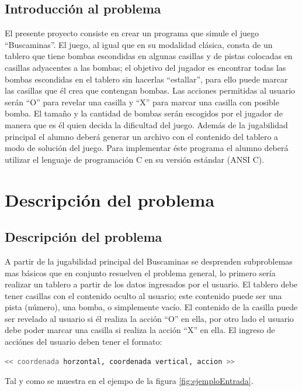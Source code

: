 \documentclass[letterpaper,12pt]{report}
\begin{document}
\section {Introducci\'on al problema}

El presente proyecto consiste en crear un programa que simule el juego ``Buscaminas''. El juego, al igual que en su modalidad clásica, consta de un tablero que tiene bombas escondidas en algunas casillas y de pistas colocadas en casillas adyacentes a las bombas; el objetivo del jugador es encontrar todas las bombas escondidas en el tablero sin hacerlas ``estallar'', para ello puede marcar las casillas que él crea que contengan bombas. Las acciones permitidas al usuario serán ``O'' para revelar una casilla y ``X'' para marcar una casilla con posible bomba. El tamaño y la cantidad de bombas serán escogidos por el jugador de manera que es él quien decida la dificultad del juego. Además de la jugabilidad principal el alumno deberá generar un archivo con el contenido del tablero a modo de solución del juego. Para implementar éste programa el alumno deberá utilizar el lenguaje de programación C en su versión estándar (ANSI C).

\chapter{Descripci\'on del problema}

\section {Descripci\'on del problema}

A partir de la jugabilidad principal del Buscaminas se desprenden subproblemas mas básicos que en conjunto resuelven el problema general, lo primero sería realizar un tablero a partir de los datos ingresados por el usuario. El tablero debe tener casillas con el contenido oculto al usuario; este contenido puede ser una pista (número), una bomba, o simplemente vacío. El contenido de la casilla puede ser revelado al usuario si él realiza la acción ``O'' en ella, por otro lado el usuario debe poder marcar una casilla si realiza la acción ``X'' en ella. El ingreso de acciónes del usuario deben tener el formato:

\begin{lstlisting}[language=bash]
<< coordenada horzontal, coordenada vertical, accion >>
\end{lstlisting}

Tal y como se muestra en el ejempo de la figura \ref{fig:ejemploEntrada}.
\end{document}

